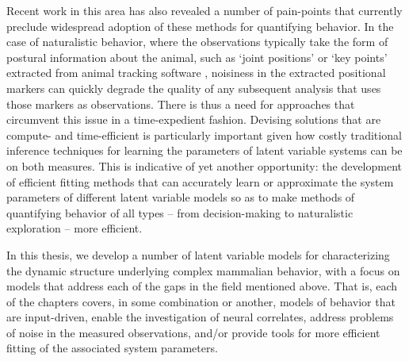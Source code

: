 Recent work in this area has also revealed a number of pain-points that currently preclude widespread adoption of these methods for quantifying behavior. In the case of naturalistic behavior, where the observations typically take the form of postural information about the animal, such as `joint positions' or `key points' extracted from animal tracking software \cite{mathis_deeplabcut_2018, pereira_fast_2019}, noisiness in the extracted positional markers can quickly degrade the quality of any subsequent analysis that uses those markers as observations. There is thus a need for approaches that circumvent this issue in a time-expedient fashion. Devising solutions that are compute- and time-efficient is particularly important given how costly traditional inference techniques \cite{baum_maximization_1970, dempster_maximum_1977, shumway_approach_1982, escola_hidden_2011, metropolis_equation_1953, hastings_monte_1970, geman_stochastic_1984, gelfand_sampling-based_1990} for learning the parameters of latent variable systems can be on both measures. This is indicative of yet another opportunity: the development of efficient fitting methods that can accurately learn or approximate the system parameters of different latent variable models so as to make methods of quantifying behavior of all types -- from decision-making to naturalistic exploration -- more efficient. 

In this thesis, we develop a number of latent variable models for characterizing the dynamic structure underlying complex mammalian behavior, with a focus on models that address each of the gaps in the field mentioned above. That is, each of the chapters covers, in some combination or another, models of behavior that are input-driven, enable the investigation of neural correlates, address problems of noise in the measured observations, and/or provide tools for more efficient fitting of the associated system parameters. 

